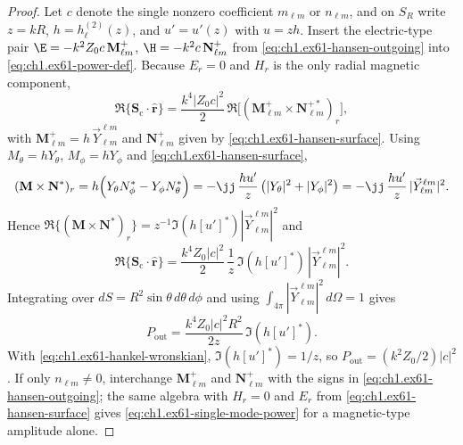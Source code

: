 \begin{proof}
Let $c$ denote the single nonzero coefficient $m_{\ell m}$ or $n_{\ell m}$, and on $S_R$ write $z=kR$, $h=h_\ell^{(2)}(z)$, and $u'=u'(z)$ with $u=zh$. Insert the electric-type pair $\E=-k^2 Z_0 c\,\mathbf M_{\ell m}^+$, $\H=-k^2 c\,\mathbf N_{\ell m}^+$ from \eqref{eq:ch1.ex61-hansen-outgoing} into \eqref{eq:ch1.ex61-power-def}. Because $E_r=0$ and $H_r$ is the only radial magnetic component,
\[
\Re\{\mathbf S_\mathrm{c}\cdot\hat{\mathbf r}\}
=\frac{k^4|Z_0 c|^2}{2}\,\Re\bigl[(\mathbf M_{\ell m}^+\times\mathbf N_{\ell m}^{+*})_r\bigr],
\]
with $\mathbf M_{\ell m}^+=h\,\vec Y_{\ell m}^{\ell m}$ and $\mathbf N_{\ell m}^+$ given by \eqref{eq:ch1.ex61-hansen-surface}. Using $M_\theta=hY_\theta$, $M_\phi=hY_\phi$ and \eqref{eq:ch1.ex61-hansen-surface},
\[
(\mathbf M\times\mathbf N^*)_r
=h\Bigl(Y_\theta N_\phi^*-Y_\phi N_\theta^*\Bigr)
=-\jj\,\frac{h u'}{z}\,\bigl(|Y_\theta|^2+|Y_\phi|^2\bigr)
=-\jj\,\frac{h u'}{z}\,|\vec Y_{\ell m}^{\ell m}|^2.
\]
Hence $\Re\{(\mathbf M\times\mathbf N^*)_r\}=z^{-1}\Im(h[u']^*)|\vec Y_{\ell m}^{\ell m}|^2$ and
\[
\Re\{\mathbf S_\mathrm{c}\cdot\hat{\mathbf r}\}
=\frac{k^4 Z_0 |c|^2}{2}\,\frac{1}{z}\,\Im(h[u']^*)\,|\vec Y_{\ell m}^{\ell m}|^2.
\]
Integrating over $dS=R^2\sin\theta\,d\theta\,d\phi$ and using $\int_{4\pi}|\vec Y_{\ell m}^{\ell m}|^2\,d\Omega=1$ gives
\[
P_{\mathrm{out}}=\frac{k^4 Z_0 |c|^2 R^2}{2z}\,\Im(h[u']^*).
\]
With \eqref{eq:ch1.ex61-hankel-wronskian}, $\Im(h[u']^*)=1/z$, so $P_{\mathrm{out}}=(k^2 Z_0/2)|c|^2$.
If only $n_{\ell m}\neq0$, interchange $\mathbf M_{\ell m}^+$ and $\mathbf N_{\ell m}^+$ with the signs in \eqref{eq:ch1.ex61-hansen-outgoing}; the same algebra with $H_r=0$ and $E_r$ from \eqref{eq:ch1.ex61-hansen-surface} gives \eqref{eq:ch1.ex61-single-mode-power} for a magnetic-type amplitude alone.


\end{proof}
